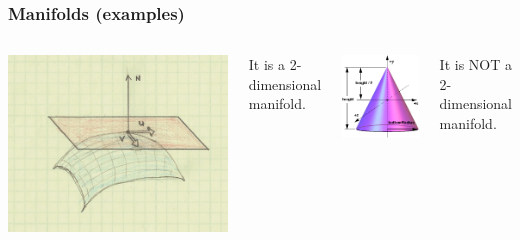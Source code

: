 \begin{frame}
  \frametitle{Manifolds (examples)}
  \begin{columns}
    \begin{center}
      \includegraphics[scale=.11]{Pictures/Tang-vect2.jpg}
    \end{center}
    It \alert{is} a 2-dimensional manifold.
    \begin{center}
      \includegraphics[scale=.3]{Pictures/cone.png}
    \end{center}
    It \alert{is NOT} a 2-dimensional manifold.
  \end{columns}
\end{frame}

